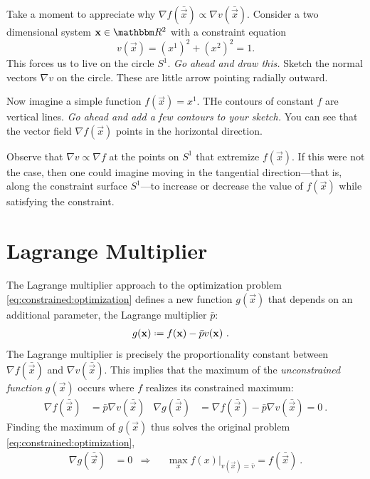 \begin{exercise}
Take a moment to appreciate why $\nabla f(\bar{\vec{x}}) \propto \nabla v(\bar{\vec{x}})$. Consider a two dimensional system $\vec{x}\in \RR^2$ with a constraint equation $$v(\vec{x}) = (x^1)^2 + (x^2)^2 = 1.$$ This forces us to live on the circle $S^1$. \emph{Go ahead and draw this.} Sketch the normal vectors $\nabla v$ on the circle. These are little arrow pointing radially outward.

Now imagine a simple function $f(\vec{x})=x^1$. THe contours of constant $f$ are vertical lines. \emph{Go ahead and add a few contours to your sketch.} You can see that the vector field $\nabla f(\vec{x})$ points in the horizontal direction. 

Observe that $\nabla v \propto \nabla f$ at the points on $S^1$ that extremize $f(\vec{x})$. If this were not the case, then one could imagine moving in the tangential direction---that is, along the constraint surface $S^1$---to increase or decrease the value of $f(\vec{x})$ while satisfying the constraint.
\end{exercise}

\section{Lagrange Multiplier}



The Lagrange multiplier approach to the optimization problem \eqref{eq:constrained:optimization} defines a new function $g(\vec{x})$ that depends on an additional parameter, the Lagrange multiplier $\bar p$:
\begin{align}
    g(\vec{x}) &\defeq f(\vec{x}) - \bar p v(\vec{x}) \ .
\end{align}
The Lagrange multiplier is precisely the proportionality constant between $\nabla f(\bar{\vec{x}})$ and $\nabla v(\bar{\vec{x}})$. This implies that the maximum of the \emph{unconstrained function} $g(\vec{x})$ occurs where $f$ realizes its constrained maximum:
\begin{align}
    \nabla f(\bar{\vec{x}}) &= \bar p \nabla v(\bar{\vec{x}}) 
    &
    \nabla g(\bar{\vec{x}}) &= \nabla f(\bar{\vec{x}}) - \bar p \nabla v(\bar{\vec{x}}) = 0 
    \ .
    \label{eq:unconstrained:maximization}
\end{align}
Finding the maximum of $g(\vec{x})$ thus solves the original problem \eqref{eq:constrained:optimization},
\begin{align}
    \nabla g(\bar{\vec{x}}) &= 0
    &\Rightarrow & &
    \max_x \left.f(x)\right|_{v(\vec{x})=\bar v} = f(\bar{\vec{x}})    \ .
\end{align}



